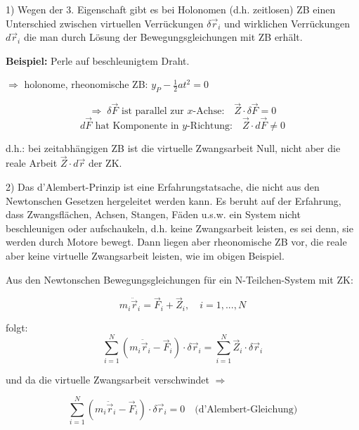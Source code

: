 \documentclass[10pt, letterpaper]{article}
\begin{document}
1) Wegen der 3. Eigenschaft gibt es bei Holonomen (d.h. zeitlosen) ZB einen Unterschied zwischen virtuellen Verrückungen $\delta\vec{r}_i$ und wirklichen Verrückungen $d\vec{r}_i$ die man durch Lösung der Bewegungsgleichungen mit ZB erhält.

\textbf{Beispiel:} Perle auf beschleunigtem Draht.


$\Rightarrow$ holonome, rheonomische ZB: $y_P - \frac{1}{2}at^2 = 0$

\[
\Rightarrow \; \delta \vec{F} \text{ ist parallel zur } x\text{-Achse:} \quad \vec{Z} \cdot \delta \vec{F} = 0
\]
\[
d \vec{F} \text{ hat Komponente in } y\text{-Richtung:} \quad \vec{Z} \cdot d \vec{F} \neq 0
\]

d.h.: bei zeitabhängigen ZB ist die virtuelle Zwangsarbeit Null, nicht aber die reale Arbeit $\vec{Z} \cdot d\vec{r}$ der ZK.

2) Das d'Alembert-Prinzip ist eine Erfahrungstatsache, die nicht aus den Newtonschen Gesetzen hergeleitet werden kann. Es beruht auf der Erfahrung, dass Zwangsflächen, Achsen, Stangen, Fäden u.s.w. ein System nicht beschleunigen oder aufschaukeln, d.h. keine Zwangsarbeit leisten, es sei denn, sie werden durch Motore bewegt. Dann liegen aber rheonomische ZB vor, die reale aber keine virtuelle Zwangsarbeit leisten, wie im obigen Beispiel.

Aus den Newtonschen Bewegungsgleichungen für ein N-Teilchen-System mit ZK:

\[m_i \ddot{\vec{r}}_i = \vec{F}_i + \vec{Z}_i, \quad i=1,...,N\]

folgt: \[\sum_{i=1}^N (m_i \ddot{\vec{r}}_i-\vec{F}_i) \cdot \delta \vec{r}_i = \sum_{i=1}^N \vec{Z}_i \cdot \delta \vec{r}_i\]

und da die virtuelle Zwangsarbeit verschwindet $\Rightarrow$

\[\sum_{i=1}^N (m_i \ddot{\vec{r}}_i-\vec{F}_i) \cdot \delta \vec{r}_i = 0 \quad \text{(d'Alembert-Gleichung)}\]
\end{document}
